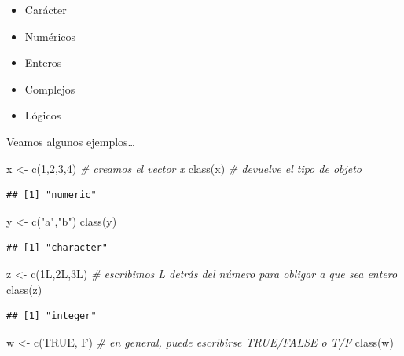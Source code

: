 \documentclass[
]{book}
\newenvironment{Shaded}{\begin{snugshade}}{\end{snugshade}}
\newcommand{\CommentTok}[1]{\textcolor[rgb]{0.56,0.35,0.01}{\textit{#1}}}
\newcommand{\ConstantTok}[1]{\textcolor[rgb]{0.00,0.00,0.00}{#1}}
\newcommand{\DecValTok}[1]{\textcolor[rgb]{0.00,0.00,0.81}{#1}}
\newcommand{\FunctionTok}[1]{\textcolor[rgb]{0.00,0.00,0.00}{#1}}
\newcommand{\NormalTok}[1]{#1}
\newcommand{\OtherTok}[1]{\textcolor[rgb]{0.56,0.35,0.01}{#1}}
\newcommand{\StringTok}[1]{\textcolor[rgb]{0.31,0.60,0.02}{#1}}
\begin{document}
\begin{itemize}
\item
  Carácter
\item
  Numéricos
\item
  Enteros
\item
  Complejos
\item
  Lógicos
\end{itemize}

Veamos algunos ejemplos\ldots{}

\begin{Shaded}
\begin{Highlighting}[]
\NormalTok{x }\OtherTok{\textless{}{-}} \FunctionTok{c}\NormalTok{(}\DecValTok{1}\NormalTok{,}\DecValTok{2}\NormalTok{,}\DecValTok{3}\NormalTok{,}\DecValTok{4}\NormalTok{)    }\CommentTok{\# creamos el vector x}
\FunctionTok{class}\NormalTok{(x)           }\CommentTok{\# devuelve el tipo de objeto}
\end{Highlighting}
\end{Shaded}

\begin{verbatim}
## [1] "numeric"
\end{verbatim}

\begin{Shaded}
\begin{Highlighting}[]
\NormalTok{y }\OtherTok{\textless{}{-}} \FunctionTok{c}\NormalTok{(}\StringTok{"a"}\NormalTok{,}\StringTok{"b"}\NormalTok{)}
\FunctionTok{class}\NormalTok{(y)}
\end{Highlighting}
\end{Shaded}

\begin{verbatim}
## [1] "character"
\end{verbatim}

\begin{Shaded}
\begin{Highlighting}[]
\NormalTok{z }\OtherTok{\textless{}{-}} \FunctionTok{c}\NormalTok{(1L,2L,3L)   }\CommentTok{\# escribimos L detrás del número para obligar a que sea entero}
\FunctionTok{class}\NormalTok{(z)}
\end{Highlighting}
\end{Shaded}

\begin{verbatim}
## [1] "integer"
\end{verbatim}

\begin{Shaded}
\begin{Highlighting}[]
\NormalTok{w }\OtherTok{\textless{}{-}} \FunctionTok{c}\NormalTok{(}\ConstantTok{TRUE}\NormalTok{, F)    }\CommentTok{\# en general, puede escribirse TRUE/FALSE o T/F}
\FunctionTok{class}\NormalTok{(w)}
\end{Highlighting}
\end{Shaded}
\end{document}
